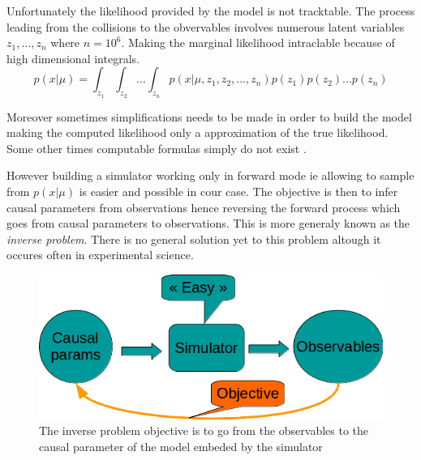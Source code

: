 
Unfortunately the likelihood provided by the model is not tracktable.
The process leading from the collisions to the obvervables involves numerous latent variables $z_1, ..., z_n$ where $n=10^6$.
Making the marginal likelihood intraclable because of high dimensional integrals.
\begin{equation}
	\label{eq:intractable_integral}
	p(x|\mu) = \int_{z_1} \int_{z_2} ... \int_{z_n} p(x|\mu, z_1, z_2, ..., z_n) p(z_1) p(z_2) ... p(z_n)
\end{equation}


Moreover sometimes simplifications needs to be made in order to build the model \needcite making the computed likelihood only a approximation of the true likelihood.
Some other times computable formulas simply do not exist \needcite.



However building a simulator working only in forward mode ie allowing to sample from $p(x|\mu)$ is easier and possible in cour case.
The objective is then to infer causal parameters from observations hence reversing the forward process which goes from causal parameters to observations.
This is more generaly known as the \emph{inverse problem}.
There is no general solution yet to this problem altough it occures often in experimental science.


\begin{figure}[htb]
    \centering
    \includegraphics[width=0.8\linewidth]{inverse_problem}
    \caption{The inverse problem objective is to go from the observables to the causal parameter of the model embeded by the simulator}
    \label{fig:inverse_problem}
\end{figure}








